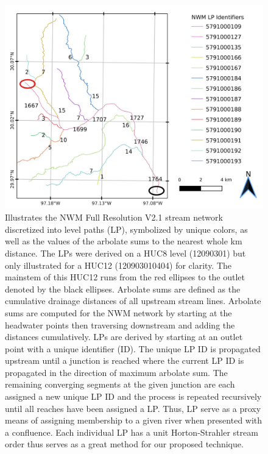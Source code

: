 \documentclass[draft]{dependencies/agujournal2019}
\begin{document}
\begin{figure}[H]
\centering
\includegraphics[scale=1.0]{figures/level_path_methods.jpg}
\caption{Illustrates the NWM Full Resolution V2.1 stream network discretized into level paths (LP), symbolized by unique colors, as well as the values of the arbolate sums to the nearest whole km distance.
The LPs were derived on a HUC8 level (12090301) but only illustrated for a HUC12 (120903010404) for clarity.
The mainstem of this HUC12 runs from the red ellipses to the outlet denoted by the black ellipses.
Arbolate sums are defined as the cumulative drainage distances of all upstream stream lines.
Arbolate sums are computed for the NWM network by starting at the headwater points then traversing downstream and adding the distances cumulatively. 
LPs are derived by starting at an outlet point with a unique identifier (ID).
The unique LP ID is propagated upstream until a junction is reached where the current LP ID is propagated in the direction of maximum arbolate sum.
The remaining converging segments at the given junction are each assigned a new unique LP ID and the process is repeated recursively until all reaches have been assigned a LP.
Thus, LP serve as a proxy means of assigning membership to a given river when presented with a confluence.
Each individual LP has a unit Horton-Strahler stream order thus serves as a great method for our proposed technique.
}
\label{fig:level_path_methods}
\end{figure}
%
%
\end{document}
